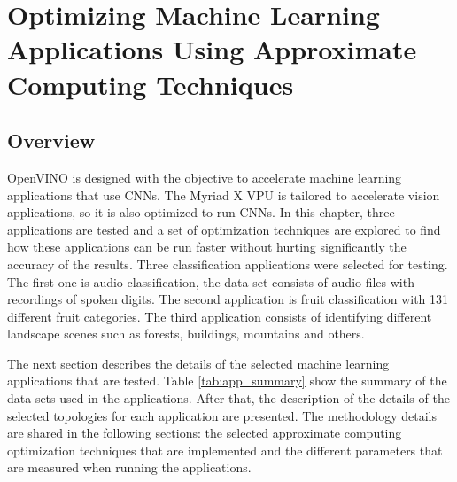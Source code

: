 \chapter{Optimizing Machine Learning Applications Using Approximate Computing Techniques}
\label{ch:ch2}

\section{Overview}

OpenVINO is designed with the objective to accelerate machine learning applications that use CNNs. The Myriad X VPU is tailored to accelerate vision applications, so it is also optimized to run CNNs. In this chapter, three applications are tested and a set of optimization techniques are explored to find how these applications can be run faster without hurting significantly the accuracy of the results. Three classification applications were selected for testing. The first one is audio classification, the data set consists of audio files with recordings of spoken digits. The second application is fruit classification with 131 different fruit categories. The third application consists of identifying different landscape scenes such as forests, buildings, mountains and others.

The next section describes the details of the selected machine learning applications that are tested. Table \ref{tab:app_summary} show the summary of the data-sets used in the applications. After that, the description of the details of the selected topologies for each application are presented. The methodology details are shared in the following sections: the selected approximate computing optimization techniques that are implemented and the different parameters that are measured when running the applications.

